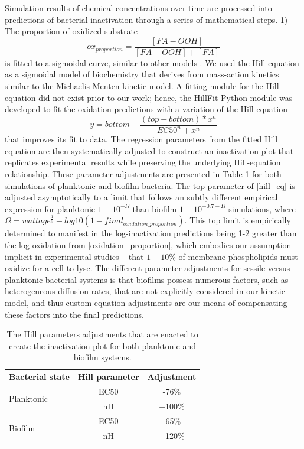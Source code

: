 Simulation results of chemical concentrations over time are processed into predictions of bacterial inactivation through a series of mathematical steps. 1) The proportion of oxidized substrate
\begin{equation} \label{oxidation_proportion}
    ox_{proportion} = \frac{[FA-OOH]}{[FA-OOH]+[FA]}
\end{equation}
is fitted to a sigmoidal curve, similar to other models \cite{Xiong1999AInactivation}. We used the Hill-equation \cite{Gesztelyi2012ThePharmacology} as a sigmoidal model of biochemistry that derives from mass-action kinetics similar to the Michaelis-Menten kinetic model. A fitting module for the Hill-equation did not exist prior to our work; hence, the HillFit Python module was developed to fit the oxidation predictions with a variation of the Hill-equation \cite{Inoue2016OscillationActivation} 
\begin{equation} \label{hill_eq}
    y=bottom+\frac{(top-bottom)*x^n}{EC50^n+x^n}
\end{equation}
that improves its fit to data. The regression parameters from the fitted Hill equation are then systematically adjusted to construct an inactivation plot that replicates experimental results while preserving the underlying Hill-equation relationship. These parameter adjustments are presented in Table \ref{hill_parameters} for both simulations of planktonic and biofilm bacteria. The top parameter of \cref{hill_eq} is adjusted asymptotically to a limit that follows an subtly different empirical expression for planktonic $1-10^{-\Omega}$ than biofilm $1-10^{-0.7-\Omega }$ simulations, where $\Omega = wattage^{\frac{1}{5}}-log10(1-final_{oxidation\_proportion})$. This top limit is empirically determined to manifest in the log-inactivation predictions being 1-2 greater than the log-oxidation from \cref{oxidation_proportion}, which embodies our assumption -- implicit in experimental studies -- that $1-10\%$ of membrane phospholipids must oxidize for a cell to lyse. The different parameter adjustments for sessile versus planktonic bacterial systems is that biofilms possess numerous factors, such as heterogeneous diffusion rates, that are not explicitly considered in our kinetic model, and thus custom equation adjustments are our means of compensating these factors into the final predictions. 

\begin{table}[]
    \centering
    \begin{tabular}{l|c|c}
        \textbf{Bacterial state} & \textbf{Hill parameter} & \textbf{Adjustment} \\
        \multirow{2}{0}{Planktonic} & EC50 & -76\% \\
         & nH & +100\% \\
         \midrule
         \multirow{2}{0}{Biofilm} & EC50 & -65\% \\
         & nH & +120\% \\
    \end{tabular}
    \caption{
        The Hill parameters adjustments that are enacted to create the inactivation plot for both planktonic and biofilm systems. 
    }
    \label{hill_parameters}
\end{table}

